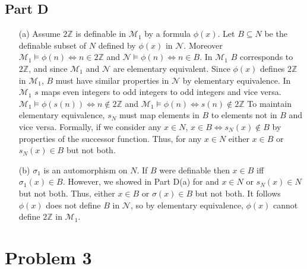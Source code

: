 \documentclass[10pt]{article}
\begin{document}
\subsection*{Part D}
    \begin{itemize}
        \item [(a)] Assume $2\mathbb{Z}$ is definable in $\mathcal{M}_1$ by a formula $\phi(x)$. 
        Let $B\subseteq N$ be the definable subset of $N$ defined by $\phi(x)$ in $\mathcal{N}$. 
        Moreover $\mathcal{M}_1\models\phi(n)\Leftrightarrow n\in 2\mathbb{Z}$ and $\mathcal{N}\models\phi(n)\Leftrightarrow n\in B$.
        In $\mathcal{M}_1$ $B$ corresponds to $2\mathbb{Z}$, and since $\mathcal{M}_1$ and $\mathcal{N}$ are elementary equivalent.
        Since $\phi(x)$ defines $2\mathbb{Z}$ in $\mathcal{M}_1$, $B$ must have similar properties in $\mathcal{N}$ by elementary equivalence.
        In $\mathcal{M}_1$ $s$ maps even integers to odd integers to odd integers and vice versa. 
        $\mathcal{M}_1\models\phi(s(n))\Leftrightarrow n\not\in 2\mathbb{Z}$ and $\mathcal{M}_1\models\phi(n)\Leftrightarrow s(n)\not\in 2\mathbb{Z}$
        To maintain elementary equivalence, $s_N$ must map elements in $B$ to elements not in $B$ and vice versa.
        Formally, if we consider any $x\in N$, $x\in B\Leftrightarrow s_N(x)\not\in B$ by properties of the successor function. 
        Thus, for any $x\in N$ either $x\in B$ or $s_N(x)\in B$ but not both.
        \item [(b)] $\sigma_1$ is an automorphism on $N$. 
        If $B$ were definable then $x\in B$ iff $\sigma_1(x)\in B$.
        However, we showed in Part D(a) for and $x\in N$ or $s_N(x)\in N$ but not both. 
        Thus, either $x\in B$ or $\sigma(x)\in B$ but not both.
        It follows $\phi(x)$ does not define $B$ in $\mathcal{N}$, so by elementary equivalence, $\phi(x)$ cannot define $2\mathbb{Z}$ in $\mathcal{M}_1$.
    \end{itemize}
\section*{Problem 3}
\end{document}
